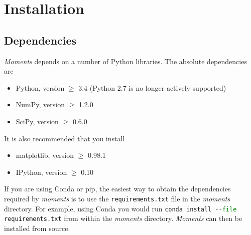 \documentclass[12pt]{article}
\makeatletter
\newcommand{\dadi}{$\partial$a$\partial$i\xspace}
\newcommand{\py}[1]{\lstinline[breaklines=true,language=Python, showstringspaces=False]@#1@}
\makeatother
\begin{document}
\section{Installation}

\subsection{Dependencies}

\textit{Moments} depends on a number of Python libraries. The absolute dependencies are
\begin{itemize}
\item Python, version $\geq$ 3.4 (Python 2.7 is no longer actively supported)
\item NumPy, version $\geq$ 1.2.0
\item SciPy, version $\geq$ 0.6.0
\end{itemize}
It is also recommended that you install
\begin{itemize}
\item matplotlib, version $\geq$ 0.98.1
\item IPython, version $\geq$ 0.10
\end{itemize}

If you are using Conda or pip, the easiest way to obtain the dependencies required by \textit{moments} is to use the \py{requirements.txt} file in the \textit{moments} directory.
For example, using Conda you would run \py{conda install --file requirements.txt} from within the \textit{moments} directory.
\textit{Moments} can then be installed from source.



\end{document}

